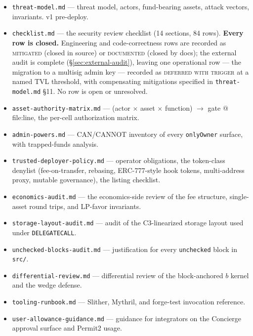 \documentclass[11pt]{article}
\begin{document}
\begin{itemize}
  \item \texttt{threat-model.md} --- threat model, actors, fund-bearing
        assets, attack vectors, invariants. v1 pre-deploy.
  \item \texttt{checklist.md} --- the security review checklist (14
        sections, 84 rows). \textbf{Every row is closed.} Engineering and
        code-correctness rows are recorded as \textsc{mitigated} (closed
        in source) or \textsc{documented} (closed by docs); the external
        audit is complete (\S\ref{sec:external-audit}), leaving one
        operational row --- the migration to a multisig admin key ---
        recorded as \textsc{deferred with trigger} at a named TVL
        threshold, with compensating mitigations specified in
        \texttt{threat-model.md} \S 11. No row is open or
        unresolved.
  \item \texttt{asset-authority-matrix.md} --- (actor $\times$ asset $\times$
        function) $\to$ gate $@$ file:line, the per-cell authorization matrix.
  \item \texttt{admin-powers.md} --- CAN/CANNOT inventory of every
        \texttt{onlyOwner} surface, with trapped-funds analysis.
  \item \texttt{trusted-deployer-policy.md} --- operator obligations, the
        token-class denylist (fee-on-transfer, rebasing, ERC-777-style hook
        tokens, multi-address proxy, mutable governance), the listing
        checklist.
  \item \texttt{economics-audit.md} --- the economics-side review of the
        fee structure, single-asset round trips, and LP-favor invariants.
  \item \texttt{storage-layout-audit.md} --- audit of the C3-linearized
        storage layout used under \texttt{DELEGATECALL}.
  \item \texttt{unchecked-blocks-audit.md} --- justification for every
        \texttt{unchecked} block in \texttt{src/}.
  \item \texttt{differential-review.md} --- differential review of the
        block-anchored $b$ kernel and the wedge defense.
  \item \texttt{tooling-runbook.md} --- Slither, Mythril, and forge-test
        invocation reference.
  \item \texttt{user-allowance-guidance.md} --- guidance for integrators on
        the Concierge approval surface and Permit2 usage.
\end{itemize}
\end{document}
